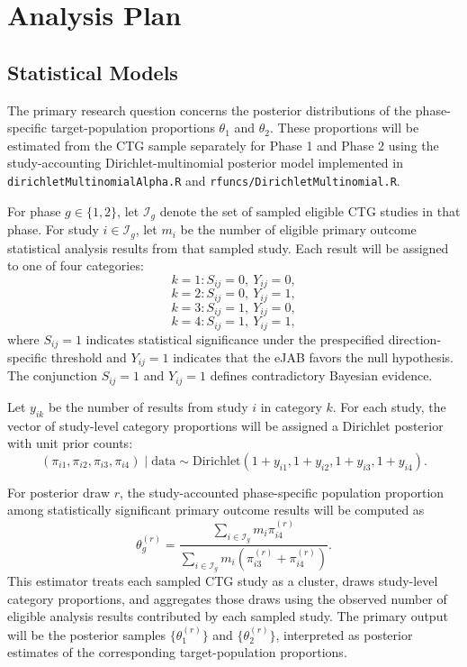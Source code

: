 \documentclass[11pt]{article}
\begin{document}
\section{Analysis Plan}

\subsection{Statistical Models}

The primary research question concerns the posterior distributions of the phase-specific target-population proportions \(\theta_1\) and \(\theta_2\). These proportions will be estimated from the CTG sample separately for Phase 1 and Phase 2 using the study-accounting Dirichlet-multinomial posterior model implemented in \texttt{dirichletMultinomialAlpha.R} and \texttt{rfuncs/DirichletMultinomial.R}.

For phase \(g \in \{1,2\}\), let \(\mathcal{I}_g\) denote the set of sampled eligible CTG studies in that phase. For study \(i \in \mathcal{I}_g\), let \(m_i\) be the number of eligible primary outcome statistical analysis results from that sampled study. Each result will be assigned to one of four categories:
\[
k=1: S_{ij}=0,\ Y_{ij}=0,
\]
\[
k=2: S_{ij}=0,\ Y_{ij}=1,
\]
\[
k=3: S_{ij}=1,\ Y_{ij}=0,
\]
\[
k=4: S_{ij}=1,\ Y_{ij}=1,
\]
where \(S_{ij}=1\) indicates statistical significance under the prespecified direction-specific threshold and \(Y_{ij}=1\) indicates that the eJAB favors the null hypothesis. The conjunction \(S_{ij}=1\) and \(Y_{ij}=1\) defines contradictory Bayesian evidence.

Let \(y_{ik}\) be the number of results from study \(i\) in category \(k\). For each study, the vector of study-level category proportions will be assigned a Dirichlet posterior with unit prior counts:
\[
(\pi_{i1},\pi_{i2},\pi_{i3},\pi_{i4}) \mid \text{data}
\sim
\mathrm{Dirichlet}(1+y_{i1},1+y_{i2},1+y_{i3},1+y_{i4}).
\]

For posterior draw \(r\), the study-accounted phase-specific population proportion among statistically significant primary outcome results will be computed as
\[
\theta_g^{(r)}
=
\frac{
\sum_{i \in \mathcal{I}_g} m_i \pi_{i4}^{(r)}
}{
\sum_{i \in \mathcal{I}_g} m_i\left(\pi_{i3}^{(r)}+\pi_{i4}^{(r)}\right)
}.
\]
This estimator treats each sampled CTG study as a cluster, draws study-level category proportions, and aggregates those draws using the observed number of eligible analysis results contributed by each sampled study. The primary output will be the posterior samples \(\{\theta_1^{(r)}\}\) and \(\{\theta_2^{(r)}\}\), interpreted as posterior estimates of the corresponding target-population proportions.
\end{document}
